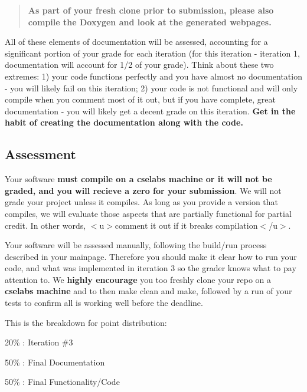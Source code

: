 \begin{quote}
{\bfseries As part of your fresh clone prior to submission, please also compile the Doxygen and look at the generated webpages.} \end{quote}


All of these elements of documentation will be assessed, accounting for a significant portion of your grade for each iteration (for this iteration -\/ iteration 1, documentation will account for 1/2 of your grade). Think about these two extremes\+: 1) your code functions perfectly and you have almost no documentation -\/ you will likely fail on this iteration; 2) your code is not functional and will only compile when you comment most of it out, but if you have complete, great documentation -\/ you will likely get a decent grade on this iteration. {\bfseries Get in the habit of creating the documentation along with the code.}





\subsection*{Assessment}

Your software {\bfseries must compile on a cselabs machine or it will not be graded, and you will recieve a zero for your submission}. We will not grade your project unless it compiles. As long as you provide a version that compiles, we will evaluate those aspects that are partially functional for partial credit. In other words, $<$u$>$comment it out if it breaks compilation$<$/u$>$.

Your software will be assessed manually, following the build/run process described in your mainpage. Therefore you should make it clear how to run your code, and what was implemented in iteration 3 so the grader knows what to pay attention to. We {\bfseries highly encourage} you too freshly clone your repo on a {\bfseries cselabs machine} and to then {\ttfamily make clean} and {\ttfamily make}, followed by a run of your tests to confirm all is working well before the deadline.

This is the breakdown for point distribution\+:

20\% \+: Iteration \#3
\begin{DoxyItemize}
\item 50\% \+: Final Documentation
\item 50\% \+: Final Functionality/\+Code
\end{DoxyItemize}


